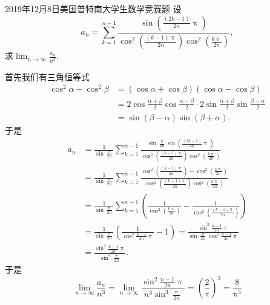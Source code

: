 \documentclass[UTF8,no-math,12pt,openany,table,dvipsnames,svgnames]{book}
\renewcommand{\pi}{\uppi}
\newcommand{\hei}{\CJKfamily{hei}}
\newenvironment{solve}{\par\indent{\hei 解}\hspace{1em}}{\par}
\begin{document}
\begin{MYBOX}[colbacktitle=blue]{2019年12月8日美国普特南大学生数学竞赛题}
设
\[
a_n=\sum_{k=1}^{n-1}{\frac{\sin \left( \frac{\left( 2k-1 \right)}{2n}\pi \right)}{\cos ^2\left( \frac{\left( k-1 \right) \pi}{2n} \right) \cos ^2\left( \frac{k\pi}{2n} \right)}},
\]
求$\lim_{n\to\infty}\frac{a_n}{n^3}$.
\begin{solve}
首先我们有三角恒等式
\begin{align*}
\cos^2\alpha-\cos^2\beta&=(\cos\alpha+\cos\beta)(\cos\alpha-\cos\beta)\\
&=2\cos\frac{\alpha+\beta}2\cos\frac{\alpha-\beta}2\cdot2\sin\frac{\alpha+\beta}2
\sin\frac{\beta-\alpha}2\\
&=\sin(\beta-\alpha)\sin(\beta+\alpha).
\end{align*}
于是
\begin{align*}
a_n&=\frac{1}{\sin \frac{\pi}{2n}}\sum_{k=1}^{n-1}{\frac{\sin \frac{\pi}{2n}\sin \left( \frac{\left( 2k-1 \right)}{2n}\pi \right)}{\cos ^2\left( \frac{\left( k-1 \right) \pi}{2n} \right) \cos ^2\left( \frac{k\pi}{2n} \right)}}\\
&=\frac{1}{\sin \frac{\pi}{2n}}\sum_{k=1}^{n-1}{\frac{\cos ^2\left( \frac{\left( k-1 \right) \pi}{2n} \right) -\cos ^2\left( \frac{k\pi}{2n} \right)}{\cos ^2\left( \frac{\left( k-1 \right) \pi}{2n} \right) \cos ^2\left( \frac{k\pi}{2n} \right)}}\\
&=\frac{1}{\sin \frac{\pi}{2n}}\sum_{k=1}^{n-1}{\left( \frac{1}{\cos ^2\left( \frac{k\pi}{2n} \right)}-\frac{1}{\cos ^2\left( \frac{\left( k-1 \right) \pi}{2n} \right)} \right)}\\
&=\frac{1}{\sin \frac{\pi}{2n}}\left( \frac{1}{\cos ^2\frac{n-1}{2n}\pi}-1 \right)=\frac{\sin ^2\frac{n-1}{2n}\pi}{\sin \frac{\pi}{2n}\cos ^2\frac{n-1}{2n}\pi}\\
&=\frac{\sin ^2\frac{n-1}{2n}\pi}{\sin ^3\frac{\pi}{2n}}.
\end{align*}
于是
\[
\lim_{n\rightarrow \infty} \frac{a_n}{n^3}=\lim_{n\rightarrow \infty} \frac{\sin ^2\frac{n-1}{2n}\pi}{n^3\sin ^3\frac{\pi}{2n}}=\left( \frac{2}{\pi} \right) ^3=\frac{8}{\pi ^3}
\]
\end{solve}
\end{MYBOX}
\end{document}
